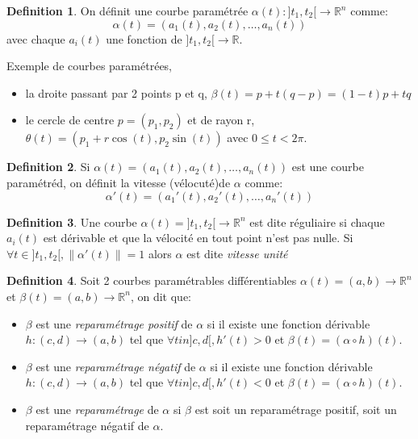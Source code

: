 \documentclass[]{book}
\theoremstyle{definition}
\newtheorem{defn}{Definition}
\newcommand{\bb}[1]{\mathbb{#1}}
\newcommand{\R}{\bb{R}}
\begin{document}
\begin{defn}
On d\'efinit une courbe param\'etr\'ee $\alpha(t): ]t_1,t_2[ \to \R^n$ comme:
$$\alpha(t) = (a_1(t), a_2(t), \ldots, a_n(t))$$
avec chaque $a_i(t)$ une fonction de $]t_1, t_2[ \to \R$. 
\end{defn}

Exemple de courbes param\'etr\'ees, 
\begin{itemize}
\item la droite passant par 2 points p et q, $\beta(t) = p +t(q-p) = (1-t)p + tq$
\item le cercle de centre $p = (p_1, p_2)$ et de rayon r, $\theta(t) = (p_1 + r\cos(t), p_2\sin(t))$ avec $0 \le t < 2\pi$.
\end{itemize}


\begin{defn}
Si $\alpha(t) = (a_1(t), a_2(t), \ldots, a_n(t))$ est une courbe param\'etr\'ed, on d\'efinit la vitesse (v\'elocut\'e)de $\alpha$  comme:
$$\alpha'(t) = (a_1'(t), a_2'(t), \ldots, a_n'(t))$$
\end{defn}

\begin{defn}
Une courbe $\alpha(t) = ]t_1, t_2[ \to \R^n$ est dite r\'eguliaire si chaque $a_i(t)$ est d\'erivable et que la v\'elocit\'e en tout point n'est pas nulle. Si $\forall t \in ]t_1, t_2[, \lVert \alpha'(t) \rVert = 1$ alors $\alpha$ est dite \emph{vitesse unit\'e}
\end{defn}


\begin{defn}
Soit 2 courbes param\'etrables diff\'erentiables $\alpha(t) = (a,b) \to \R^n$ et $\beta(t) = (a,b) \to \R^n$, on dit que:
\begin{itemize}
\item $\beta$ est une \emph{reparam\'etrage positif} de $\alpha$ si il existe une fonction d\'erivable $h: (c,d) \to (a,b)$ tel que $\forall t in ]c,d[, h'(t) > 0$ et $\beta(t) = (\alpha \circ h)(t)$. 
\item $\beta$ est une \emph{reparam\'etrage n\'egatif} de $\alpha$ si il existe une fonction d\'erivable $h: (c,d) \to (a,b)$ tel que $\forall t in ]c,d[, h'(t) < 0$ et $\beta(t) = (\alpha \circ h)(t)$. 
\item $\beta$ est une \emph{reparam\'etrage} de $\alpha$ si $\beta$ est soit un reparam\'etrage positif, soit un reparam\'etrage n\'egatif de $\alpha$. 
\end{itemize}
\end{defn}
\end{document}
